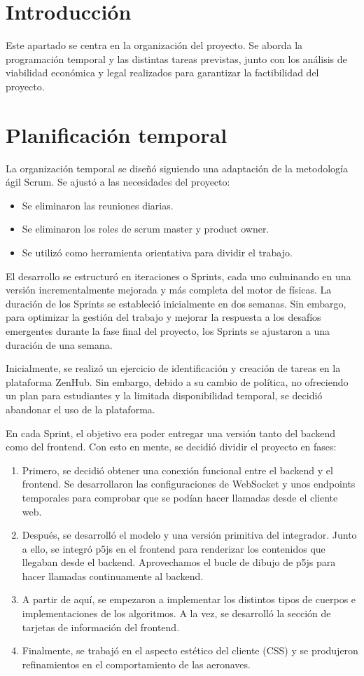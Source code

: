 
\section{Introducción}
Este apartado se centra en la organización del proyecto. Se aborda la programación temporal y las distintas tareas previstas, junto con los análisis de viabilidad económica y legal realizados para garantizar la factibilidad del proyecto.
\section{Planificación temporal}
La organización temporal se diseñó siguiendo una adaptación de la metodología ágil Scrum. Se ajustó a las necesidades del proyecto:
\begin{itemize}
    \item Se eliminaron las reuniones diarias.
    \item Se eliminaron los roles de scrum master y product owner.
    \item Se utilizó como herramienta orientativa para dividir el trabajo.
\end{itemize}

El desarrollo se estructuró en iteraciones o Sprints, cada uno culminando en una versión incrementalmente mejorada y más completa del motor de físicas. La duración de los Sprints se estableció inicialmente en dos semanas. Sin embargo, para optimizar la gestión del trabajo y mejorar la respuesta a los desafíos emergentes durante la fase final del proyecto, los Sprints se ajustaron a una duración de una semana.

Inicialmente, se realizó un ejercicio de identificación y creación de tareas en la plataforma ZenHub. Sin embargo, debido a su cambio de política, no ofreciendo un plan para estudiantes y la limitada disponibilidad temporal, se decidió abandonar el uso de la plataforma. 

En cada Sprint, el objetivo era poder entregar una versión tanto del backend como del frontend. Con esto en mente, se decidió dividir el proyecto en fases:

\begin{enumerate}
    \item Primero, se decidió obtener una conexión funcional entre el backend y el frontend. Se desarrollaron las configuraciones de WebSocket y unos endpoints temporales para comprobar que se podían hacer llamadas desde el cliente web.
    \item Después, se desarrolló el modelo y una versión primitiva del integrador. Junto a ello, se integró p5js en el frontend para renderizar los contenidos que llegaban desde el backend. Aprovechamos el bucle de dibujo de p5js para hacer llamadas continuamente al backend.
    \item A partir de aquí, se empezaron a implementar los distintos tipos de cuerpos e implementaciones de los algoritmos. A la vez, se desarrolló la sección de tarjetas de información del frontend.
    \item Finalmente, se trabajó en el aspecto estético del cliente (CSS) y se produjeron refinamientos en el comportamiento de las aeronaves.
\end{enumerate}
